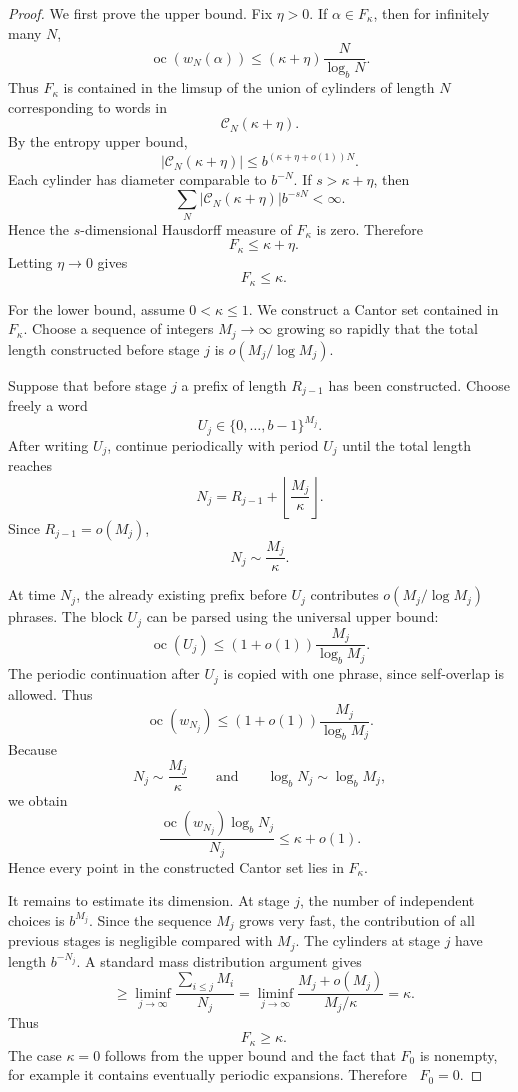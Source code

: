 \documentclass[11pt]{amsart}
\DeclareMathOperator{\oc}{oc}
\DeclareMathOperator{\dimH}{dim_H}
\begin{document}
\begin{proof}
We first prove the upper bound. Fix $\eta>0$. If $\alpha\in F_\kappa$, then for infinitely many $N$,
\[
\oc(w_N(\alpha))
\leq
(\kappa+\eta)\frac{N}{\log_b N}.
\]
Thus $F_\kappa$ is contained in the limsup of the union of cylinders of length $N$ corresponding to words in
\[
\mathcal C_N(\kappa+\eta).
\]
By the entropy upper bound,
\[
|\mathcal C_N(\kappa+\eta)|
\leq
b^{(\kappa+\eta+o(1))N}.
\]
Each cylinder has diameter comparable to $b^{-N}$. If $s>\kappa+\eta$, then
\[
\sum_N
|\mathcal C_N(\kappa+\eta)| b^{-sN}
<
\infty.
\]
Hence the $s$-dimensional Hausdorff measure of $F_\kappa$ is zero. Therefore
\[
\dimH F_\kappa\leq \kappa+\eta.
\]
Letting $\eta\to0$ gives
\[
\dimH F_\kappa\leq\kappa.
\]

For the lower bound, assume $0<\kappa\leq1$. We construct a Cantor set contained in $F_\kappa$. Choose a sequence of integers $M_j\to\infty$ growing so rapidly that the total length constructed before stage $j$ is $o(M_j/\log M_j)$.

Suppose that before stage $j$ a prefix of length $R_{j-1}$ has been constructed. Choose freely a word
\[
U_j\in\{0,\ldots,b-1\}^{M_j}.
\]
After writing $U_j$, continue periodically with period $U_j$ until the total length reaches
\[
N_j
=
R_{j-1}
+
\left\lfloor\frac{M_j}{\kappa}\right\rfloor.
\]
Since $R_{j-1}=o(M_j)$,
\[
N_j\sim \frac{M_j}{\kappa}.
\]

At time $N_j$, the already existing prefix before $U_j$ contributes $o(M_j/\log M_j)$ phrases. The block $U_j$ can be parsed using the universal upper bound:
\[
\oc(U_j)
\leq
(1+o(1))\frac{M_j}{\log_b M_j}.
\]
The periodic continuation after $U_j$ is copied with one phrase, since self-overlap is allowed. Thus
\[
\oc(w_{N_j})
\leq
(1+o(1))\frac{M_j}{\log_b M_j}.
\]
Because
\[
N_j\sim\frac{M_j}{\kappa}
\qquad\text{and}\qquad
\log_b N_j\sim\log_b M_j,
\]
we obtain
\[
\frac{\oc(w_{N_j})\log_b N_j}{N_j}
\leq
\kappa+o(1).
\]
Hence every point in the constructed Cantor set lies in $F_\kappa$.

It remains to estimate its dimension. At stage $j$, the number of independent choices is $b^{M_j}$. Since the sequence $M_j$ grows very fast, the contribution of all previous stages is negligible compared with $M_j$. The cylinders at stage $j$ have length $b^{-N_j}$. A standard mass distribution argument gives
\[
\dimH
\geq
\liminf_{j\to\infty}
\frac{\sum_{i\leq j}M_i}{N_j}
=
\liminf_{j\to\infty}
\frac{M_j+o(M_j)}{M_j/\kappa}
=
\kappa.
\]
Thus
\[
\dimH F_\kappa\geq\kappa.
\]
The case $\kappa=0$ follows from the upper bound and the fact that $F_0$ is nonempty, for example it contains eventually periodic expansions. Therefore $\dimH F_0=0$.
\end{proof}
\end{document}
